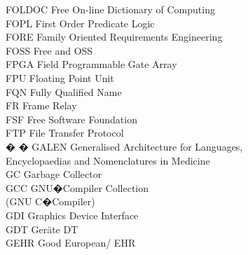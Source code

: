 \begin{tabbing}
    \>FOLDOC \>\>Free On-line Dictionary of Computing\\

    \>FOPL \>\>First Order Predicate Logic\\

    \>FORE \>\>Family Oriented Requirements Engineering\\

    \>FOSS \>\>Free and OSS\\

    \>FPGA \>\>Field Programmable Gate Array\\

    \>FPU \>\>Floating Point Unit\\

    \>FQN \>\>Fully Qualified Name\\

    \>FR \>\>Frame Relay\\


    \>FSF \>\>Free Software Foundation\\


    \>FTP \>\>File Transfer Protocol\\


� � \>GALEN \>\>Generalised Architecture for Languages,\\
        \>\>\>Encyclopaedias and Nomenclatures in Medicine\\


    \>GC \>\>Garbage Collector\\

    \>GCC \>\>GNU�Compiler Collection\\
        \>\>\>(GNU C�Compiler)\\

    \>GDI \>\>Graphics Device Interface\\

    \>GDT \>\>Ger\"{a}te DT\\

    \>GEHR \>\>Good European/ EHR\\


\end{tabbing}
